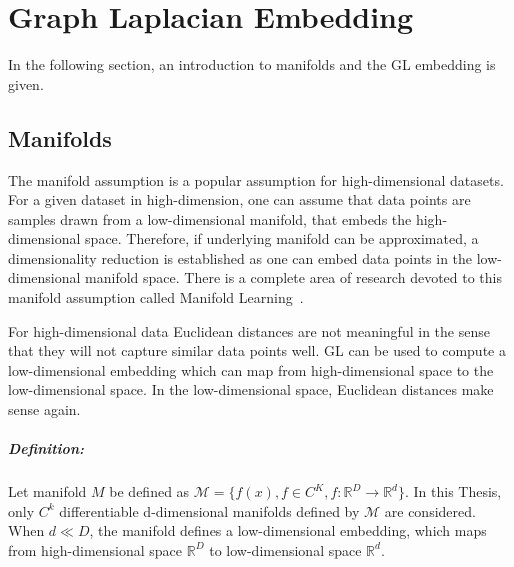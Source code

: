 \chapter{Graph Laplacian Embedding}
In the following section, an introduction to manifolds and the GL embedding is given.

\section{Manifolds}
\label{sec:manifolds}


The manifold assumption is a popular assumption for high-dimensional datasets.
For a given dataset in high-dimension, one can assume that data points are samples drawn from a low-dimensional manifold,
that embeds the high-dimensional space. 
Therefore, if underlying manifold can be approximated, a dimensionality reduction
is established as one can embed data points in the low-dimensional manifold space.
There is a complete area of research devoted to this manifold assumption called Manifold Learning~\cite{ManifoldLearning}.

For high-dimensional data Euclidean distances are not meaningful in the sense that they will not capture similar data points well. 
GL can be used to compute a low-dimensional embedding which can map from high-dimensional space to the low-dimensional space.
In the low-dimensional space, Euclidean distances make sense again. 


\paragraph{Definition:}
Let manifold $M$ be defined as $\mathcal{M} = \{ f(x), f \in C^K, f: \mathbb{R}^D \to \mathbb{R}^d \}$.
In this Thesis, only $C^k$ differentiable d-dimensional manifolds defined by $\mathcal{M}$ are considered. 
When $d \ll D$, the manifold defines a low-dimensional embedding, which maps from high-dimensional space 
$\mathbb{R}^D$ to low-dimensional space $\mathbb{R}^d$.

